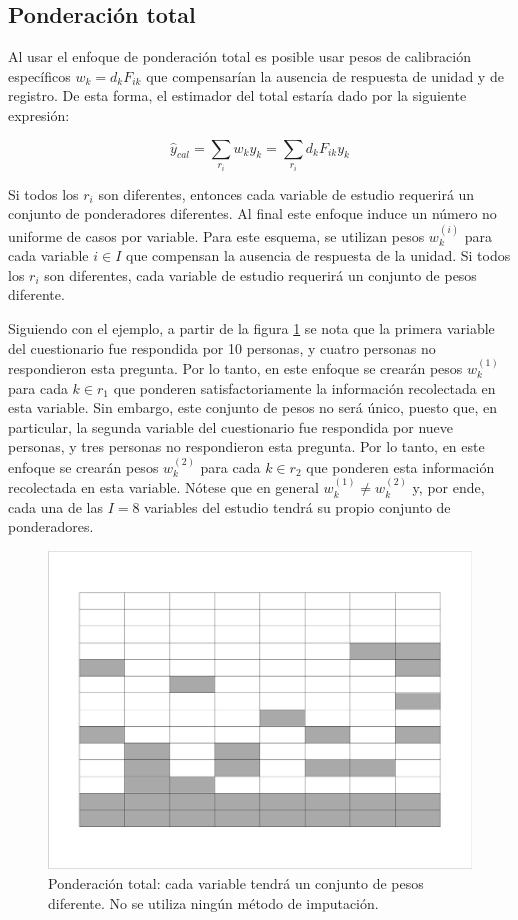 \documentclass[
  12pt,
  spanish,
]{book}
\begin{document}
\hypertarget{ponderaciuxf3n-total}{%
\subsection{Ponderación total}\label{ponderaciuxf3n-total}}

Al usar el enfoque de ponderación total es posible usar pesos de calibración específicos \(w_k = d_k F_{ik}\) que compensarían la ausencia de respuesta de unidad y de registro. De esta forma, el estimador del total estaría dado por la siguiente expresión:

\[
\hat{y}_{cal}=\sum_{r_i}w_ky_k = 
\sum_{r_i}d_k F_{ik} y_k
\]

Si todos los \(r_i\) son diferentes, entonces cada variable de estudio requerirá un conjunto de ponderadores diferentes. Al final este enfoque induce un número no uniforme de casos por variable. Para este esquema, se utilizan pesos \(w_k^{(i)}\) para cada variable \(i \in I\) que compensan la ausencia de respuesta de la unidad. Si todos los \(r_i\) son diferentes, cada variable de estudio requerirá un conjunto de pesos diferente.

Siguiendo con el ejemplo, a partir de la figura \ref{fig:figpondtotal} se nota que la primera variable del cuestionario fue respondida por 10 personas, y cuatro personas no respondieron esta pregunta. Por lo tanto, en este enfoque se crearán pesos \(w_k^{(1)}\) para cada \(k\in r_1\) que ponderen satisfactoriamente la información recolectada en esta variable. Sin embargo, este conjunto de pesos no será único, puesto que, en particular, la segunda variable del cuestionario fue respondida por nueve personas, y tres personas no respondieron esta pregunta. Por lo tanto, en este enfoque se crearán pesos \(w_k^{(2)}\) para cada \(k\in r_2\) que ponderen esta información recolectada en esta variable. Nótese que en general \(w_k^{(1)} \neq w_k^{(2)}\) y, por ende, cada una de las \(I=8\) variables del estudio tendrá su propio conjunto de ponderadores.

\begin{figure}
\includegraphics[width=0.5\linewidth]{Pics/j3} \caption{Ponderación total: cada variable tendrá un conjunto de pesos diferente. No se utiliza ningún método de imputación.}\label{fig:figpondtotal}
\end{figure}
\end{document}
